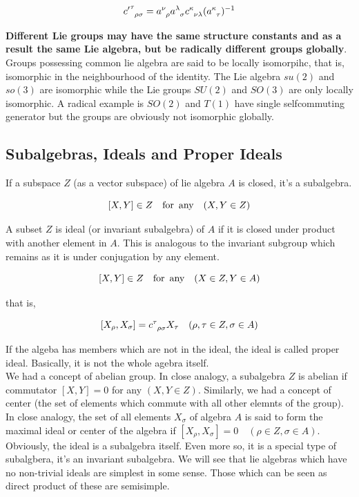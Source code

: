 \documentclass{report}
\begin{document}
$${c'}\indices{^\tau _ \rho_\sigma} = a\indices{^\nu_ \rho}a\indices{^\lambda_ \sigma}c\indices{^\kappa _\nu_\lambda} (a\indices{^\kappa _\tau})^{-1}$$

\noindent \textbf{Different Lie groups may have the same structure constants and as a result the same Lie algebra, but be radically different groups globally}. Groups possessing common lie algebra are said to be locally isomorpihc, that is, isomorphic in the neighbourhood of the identity. The Lie algebra $su(2)$ and $so(3)$ are isomorphic while the Lie groups $SU(2)$ and $SO(3)$ are only locally isomorphic. A radical example is $SO(2)$ and $T(1)$ have single selfcommuting generator but the groups are obviously not isomorphic globally.

\subsection{Subalgebras, Ideals and Proper Ideals}

If a subspace $Z$ (as a vector subspace) of lie algebra $A$ is closed, it's a subalgebra.

$$[X,Y]\in Z \quad \textrm{for\, any} \quad (X,Y \in Z)$$

\noindent A subset $Z$ is ideal (or invariant subalgebra) of $A$ if it is closed under product with another element in $A$. This is analogous to the invariant subgroup which remains as it is under conjugation by any element.

$$[X,Y]\in Z \quad \textrm{for\, any} \quad (X\in Z, Y \in A)$$

\noindent that is,

$$[X_ \rho, X_ \sigma] = c\indices{^\tau_ \rho_\sigma}X_\tau \quad (\rho,\tau \in Z, \sigma\in A)$$

\noindent If the algeba has members which are not in the ideal, the ideal is called proper ideal. Basically, it is not the whole agebra itself.\\ 

\noindent We had a concept of abelian group. In close analogy, a subalgebra $Z$ is abelian if commutator $[X,Y]=0$ for any $(X,Y \in Z)$. Similarly, we had a concept of center (the set of elements which commute with all other elemnts of the group). In close analogy, the set of all elements $X_\sigma$ of algebra $A$ is said to form the maximal ideal or center of the algebra if $[X_ \rho, X_\sigma] = 0 \quad (\rho\in Z, \sigma\in A)$.\\

\noindent Obviously, the ideal is a subalgebra itself. Even more so, it is a special type of subalgbera, it's an invariant subalgebra. We will see that lie algebras which have no non-trivial ideals are simplest in some sense. Those which can be seen as direct product of these are semisimple.\\
\end{document}
